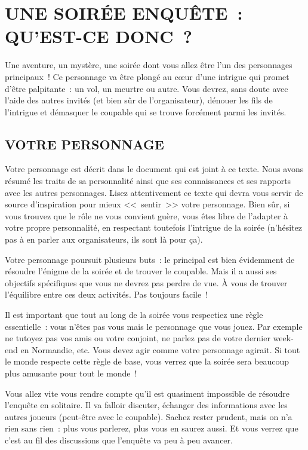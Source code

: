 \documentclass[14pt,twocolumn]{extarticle}
\begin{document}
\section{UNE SOIRÉE ENQUÊTE~: QU'EST-CE DONC~?}

Une aventure, un mystère, une soirée dont vous allez être l'un des personnages
principaux~! Ce personnage va être plongé au c\oe{}ur d'une intrigue qui promet
d'être palpitante~: un vol, un meurtre ou autre. Vous devrez, sans doute avec
l'aide des autres invités (et bien sûr de l'organisateur), dénouer les fils de
l'intrigue et démasquer le coupable qui se trouve forcément parmi les invités.

\subsection{VOTRE PERSONNAGE}

Votre personnage est décrit dans le document qui est joint à ce texte. Nous
avons résumé les traits de sa personnalité ainsi que ses connaissances et ses
rapports avec les autres personnages. Lisez attentivement ce texte qui devra
vous servir de source d'inspiration pour mieux <<~sentir~>> votre personnage.
Bien sûr, si vous trouvez que le rôle ne vous convient guère, vous êtes libre
de l'adapter à votre propre personnalité, en respectant toutefois l'intrigue de
la soirée (n'hésitez pas à en parler aux organisateurs, ils sont là pour ça).

Votre personnage poursuit plusieurs buts~: le principal est bien évidemment de
résoudre l'énigme de la soirée et de trouver le coupable. Mais il a aussi ses
objectifs spécifiques que vous ne devrez pas perdre de vue. À vous de trouver
l'équilibre entre ces deux activités. Pas toujours facile~!

Il est important que tout au long de la soirée vous respectiez une règle
essentielle~: vous n'êtes pas vous mais le personnage que vous jouez. Par
exemple ne tutoyez pas vos amis ou votre conjoint, ne parlez pas de votre
dernier week-end en Normandie, etc. Vous devez agir comme votre personnage
agirait. Si tout le monde respecte cette règle de base, vous verrez que la
soirée sera beaucoup plus amusante pour tout le monde~!

Vous allez vite vous rendre compte qu'il est quasiment impossible de résoudre
l'enquête en solitaire. Il va falloir discuter, échanger des informations avec
les autres joueurs (peut-être avec le coupable). Sachez rester prudent, mais on
n'a rien sans rien~: plus vous parlerez, plus vous en saurez aussi. Et vous
verrez que c'est au fil des discussions que l'enquête va peu à peu avancer.
\end{document}
